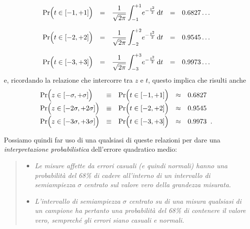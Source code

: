 \begin{displaymath}
  \begin{array}{lcccl}
    \Pr \Bigl( t \in \left[ -1 , +1 \right] \Bigr) &
      = & \dfrac{1}{\sqrt{2\pi}} \displaystyle \int
      _{-1}^{+1} \! e^{
      -\frac{t^{2}}{2}} \, \de t & = & 0.6827\ldots
      \\[4ex]
    \Pr \Bigl( t \in \left[ -2 , +2 \right] \Bigr) &
      = & \dfrac{1}{\sqrt{2\pi}} \displaystyle \int
      _{-2}^{+2} \! e^{
      -\frac{t^{2}}{2}} \, \de t & = & 0.9545\ldots
      \\[4ex]
    \Pr \Bigl( t \in \left[ -3 , +3 \right] \Bigr) &
      = & \dfrac{1}{\sqrt{2\pi}} \displaystyle \int
      _{-3}^{+3} \! e^{
      -\frac{t^{2}}{2}} \, \de t & = & 0.9973\ldots
  \end{array}
\end{displaymath}
e, ricordando la relazione che intercorre tra $z$ e
$t$, questo implica che risulti anche
\begin{displaymath}
  \begin{array}{lcccl}
    \Pr \Bigl( z \in \left[ -\sigma , +\sigma \right]
      \Bigr) & \equiv & \Pr \Bigl( t \in \left[ -1 ,
      +1 \right] \Bigr) & \approx & 0.6827 \\[1ex]
    \Pr \Bigl( z \in \left[ -2\sigma , +2\sigma \right]
      \Bigr) & \equiv & \Pr \Bigl( t \in \left[ -2 ,
      +2 \right] \Bigr) & \approx & 0.9545 \\[1ex]
    \Pr \Bigl( z \in \left[ -3\sigma , +3\sigma \right]
      \Bigr) & \equiv & \Pr \Bigl( t \in \left[ -3 ,
      +3 \right] \Bigr) & \approx & 0.9973 \;\; .
  \end{array}
\end{displaymath}%

%
Possiamo quindi far uso di una qualsiasi di queste relazioni
per dare una \emph{interpretazione probabilistica}
dell'errore quadratico medio:
\begin{quote}
  \begin{itemize}
  \item \textit{Le misure affette da errori casuali (e
      quindi normali) hanno una probabilit\`a del 68\% di
      cadere all'interno di un intervallo di semiampiezza
      $\sigma$ centrato sul valore vero della grandezza
      misurata.}
  \item \textit{L'intervallo di semiampiezza $\sigma$
      centrato su di una misura qualsiasi di un campione ha
      pertanto una probabilit\`a del 68\% di contenere il
      valore vero, semprech\'e gli errori siano casuali e
      normali.}
  \end{itemize}
\end{quote}

